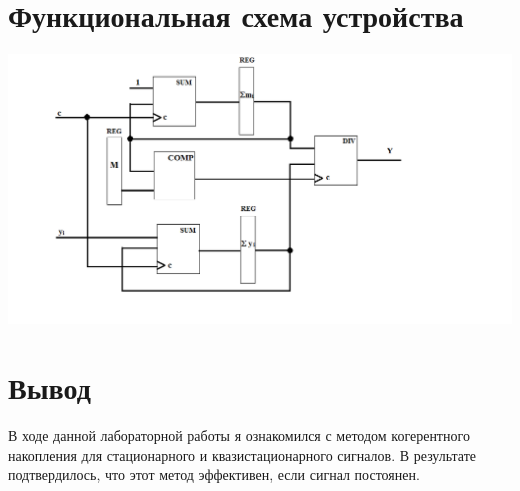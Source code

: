 \section{Функциональная схема устройства}

\includegraphics[scale=0.6]{img/scheme.png}

\section{Вывод}

В ходе данной лабораторной работы я ознакомился с методом когерентного накопления
для стационарного и квазистационарного сигналов. В результате подтвердилось,
что этот метод эффективен, если сигнал постоянен.



